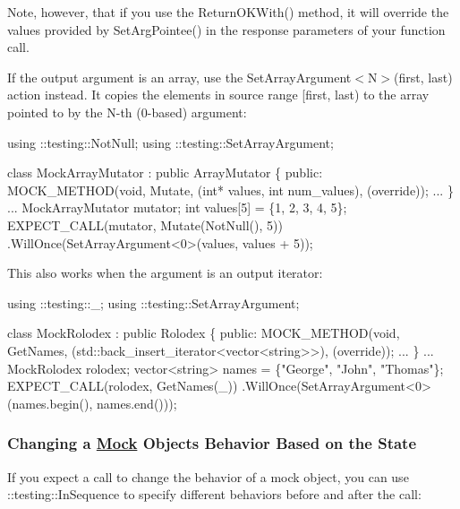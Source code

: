 Note, however, that if you use the {\ttfamily Return\+O\+K\+With()} method, it will override the values provided by {\ttfamily Set\+Arg\+Pointee()} in the response parameters of your function call.

If the output argument is an array, use the {\ttfamily Set\+Array\+Argument$<$N$>$(first, last)} action instead. It copies the elements in source range {\ttfamily \mbox{[}first, last)} to the array pointed to by the {\ttfamily N}-\/th (0-\/based) argument\+:


\begin{DoxyCode}
using ::testing::NotNull;
using ::testing::SetArrayArgument;

\textcolor{keyword}{class }MockArrayMutator : \textcolor{keyword}{public} ArrayMutator \{
 \textcolor{keyword}{public}:
  MOCK\_METHOD(\textcolor{keywordtype}{void}, Mutate, (\textcolor{keywordtype}{int}* values, \textcolor{keywordtype}{int} num\_values), (\textcolor{keyword}{override}));
  ...
\}
...
  MockArrayMutator mutator;
  \textcolor{keywordtype}{int} values[5] = \{1, 2, 3, 4, 5\};
  EXPECT\_CALL(mutator, Mutate(NotNull(), 5))
      .WillOnce(SetArrayArgument<0>(values, values + 5));
\end{DoxyCode}


This also works when the argument is an output iterator\+:


\begin{DoxyCode}
using ::testing::\_;
using ::testing::SetArrayArgument;

\textcolor{keyword}{class }MockRolodex : \textcolor{keyword}{public} Rolodex \{
 \textcolor{keyword}{public}:
  MOCK\_METHOD(\textcolor{keywordtype}{void}, GetNames, (std::back\_insert\_iterator<vector<string>>),
              (\textcolor{keyword}{override}));
  ...
\}
...
  MockRolodex rolodex;
  vector<string> names = \{\textcolor{stringliteral}{"George"}, \textcolor{stringliteral}{"John"}, \textcolor{stringliteral}{"Thomas"}\};
  EXPECT\_CALL(rolodex, GetNames(\_))
      .WillOnce(SetArrayArgument<0>(names.begin(), names.end()));
\end{DoxyCode}


\subsubsection*{Changing a \mbox{\hyperlink{classMock}{Mock}} Object\textquotesingle{}s Behavior Based on the State}

If you expect a call to change the behavior of a mock object, you can use {\ttfamily \+::testing\+::\+In\+Sequence} to specify different behaviors before and after the call\+:


